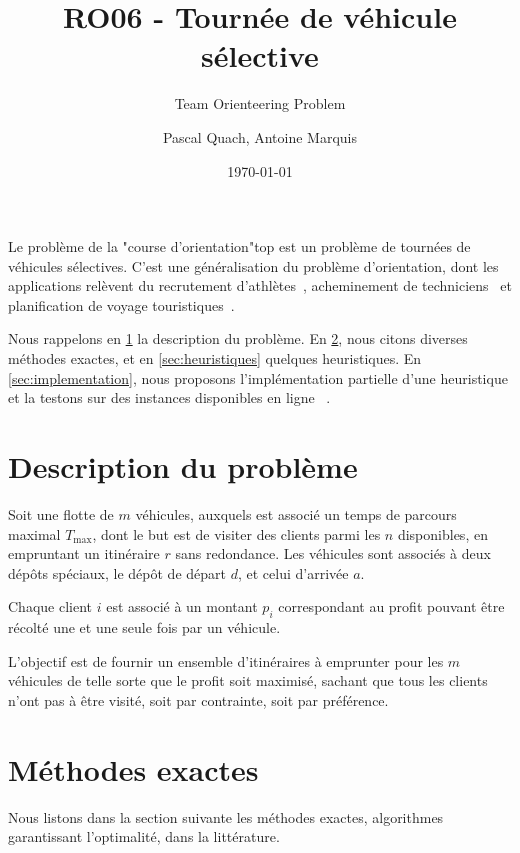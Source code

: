\documentclass[a4paper]{scrartcl}
\title{RO06 - Tournée de véhicule sélective}
\subtitle{Team Orienteering Problem}
\author{Pascal Quach, Antoine Marquis}
\date{\today}
\begin{document}
\maketitle

Le problème de la "course d'orientation"\textemdash \gls{top} \textemdash est
un problème de tournées de véhicules sélectives. C'est une généralisation du
problème d'orientation, dont les applications relèvent du recrutement
d'athlètes~\parencite{chao.etal_feb1996}, acheminement de
techniciens~\parencite{bouly.etal_mar2008,tang.miller-hooks_jun2005} et
planification de voyage
touristiques~\parencite{vansteenwegen.etal_feb2011,vansteenwegen.etal_2009}.

Nous rappelons en \cref{sec:top-description} la description du problème. En
\cref{sec:méthodes-exactes}, nous citons diverses méthodes exactes, et en
\cref{sec:heuristiques} quelques heuristiques. En \cref{sec:implementation},
nous proposons l'implémentation partielle d'une heuristique et la testons 
sur des instances disponibles en ligne
~\parencite{cib_test_instances,chao_1993,chao.etal_feb1996,tsiligirides_sep1984}.

\section{Description du problème}%
\label{sec:top-description}

Soit une flotte de $m$ véhicules, auxquels est associé un temps de parcours
maximal $T_{\max}$, dont le but est de visiter des clients parmi les $n$
disponibles, en empruntant un itinéraire $r$ sans redondance. Les véhicules
sont associés à deux dépôts spéciaux, le dépôt de départ $d$, et celui
d'arrivée $a$.

Chaque client $i$ est associé à un montant $p_i$ correspondant au profit
pouvant être récolté une et une seule fois par un véhicule.

L'objectif est de fournir un ensemble d'itinéraires à emprunter pour les $m$
véhicules de telle sorte que le profit soit maximisé, sachant que tous les
clients n'ont pas à être visité, soit par contrainte, soit par préférence.

\section{Méthodes exactes}%
\label{sec:méthodes-exactes}

Nous listons dans la section suivante les méthodes exactes, algorithmes
garantissant l'optimalité, dans la littérature. 
\end{document}
